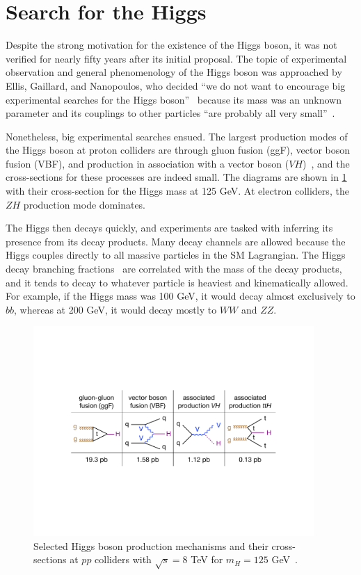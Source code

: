 \section{Search for the Higgs}

Despite the strong motivation for the existence of the Higgs boson, it was not verified for nearly fifty years after its initial proposal. The topic of experimental observation and general phenomenology of the Higgs boson was approached by Ellis, Gaillard, and Nanopoulos, who decided ``we do not want to encourage big experimental searches for the Higgs boson''~\cite{1976.higgspheno} because its mass was an unknown parameter and its couplings to other particles ``are probably all very small''~\cite{1976.higgspheno}.

Nonetheless, big experimental searches ensued. The largest production modes of the Higgs boson at proton colliders are through gluon fusion (ggF), vector boson fusion (VBF), and production in association with a vector boson ($VH$)~\cite{1984.vbf}, and the cross-sections for these processes are indeed small. The diagrams are shown in \cref{fig:sm-higgs-diagrams} with their cross-section for the Higgs mass at 125 GeV. At electron colliders, the $ZH$ production mode dominates. 

The Higgs then decays quickly, and experiments are tasked with inferring its presence from its decay products. Many decay channels are allowed because the Higgs couples directly to all massive particles in the SM Lagrangian. The Higgs decay branching fractions~\cite{1997.hdecay} are correlated with the mass of the decay products, and it tends to decay to whatever particle is heaviest and kinematically allowed. For example, if the Higgs mass was 100 GeV, it would decay almost exclusively to $bb$, whereas at 200 GeV, it would decay mostly to $WW$ and $ZZ$.

\begin{figure}[tp]
  \centering
  \includegraphics[width=0.95\textwidth]{figures/standardmodel/higgsproductions}
  \caption{Selected Higgs boson production mechanisms and their cross-sections at $pp$ colliders with $\sqrt{s} = 8$ TeV for $m_H \!=\! 125$ GeV~\cite{2013.lhchxswg}.}
  \label{fig:sm-higgs-diagrams}
\end{figure}

